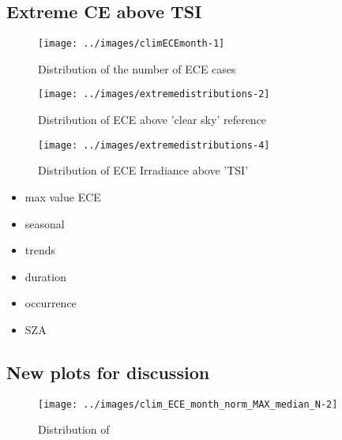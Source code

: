 \documentclass[
]{article}
\providecommand{\tightlist}{%
  \setlength{\itemsep}{0pt}\setlength{\parskip}{0pt}}
\begin{document}
\FloatBarrier

\hypertarget{extreme-ce-above-tsi}{%
\subsection{Extreme CE above TSI}\label{extreme-ce-above-tsi}}

\begin{figure}[h!]

{\centering \texttt{[image: ../images/climECEmonth-1]} 

}

\caption{Distribution of the number of ECE cases}\label{fig:unnamed-chunk-6}
\end{figure}

\begin{figure}[h!]

{\centering \texttt{[image: ../images/extremedistributions-2]} 

}

\caption{Distribution of ECE above 'clear sky' reference}\label{fig:unnamed-chunk-7}
\end{figure}

\begin{figure}[h!]

{\centering \texttt{[image: ../images/extremedistributions-4]} 

}

\caption{Distribution of ECE Irradiance above 'TSI'}\label{fig:unnamed-chunk-8}
\end{figure}

\begin{itemize}
\tightlist
\item
  max value ECE
\item
  seasonal
\item
  trends
\item
  duration
\item
  occurrence
\item
  SZA
\end{itemize}

\FloatBarrier

\hypertarget{new-plots-for-discussion}{%
\subsection{New plots for discussion}\label{new-plots-for-discussion}}

\begin{figure}[h!]

{\centering \texttt{[image: ../images/clim\_ECE\_month\_norm\_MAX\_median\_N-2]} 

}

\caption{Distribution of }\label{fig:unnamed-chunk-9}
\end{figure}
\end{document}
